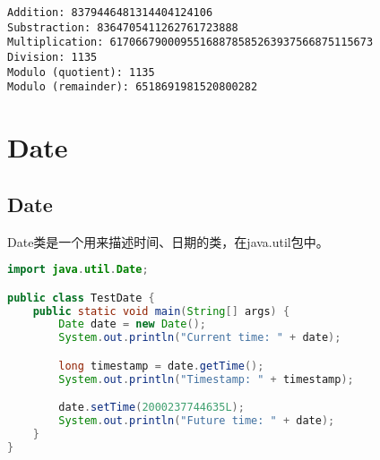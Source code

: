 \begin{tcolorbox}
	\begin{verbatim}
Addition: 8379446481314404124106
Substraction: 8364705411262761723888
Multiplication: 61706679000955168878585263937566875115673
Division: 1135
Modulo (quotient): 1135
Modulo (remainder): 6518691981520800282
	\end{verbatim}
\end{tcolorbox}

\newpage

\section{Date}

\subsection{Date}

Date类是一个用来描述时间、日期的类，在java.util包中。

\begin{table}[H]
	\centering
	\caption{Date类常用方法}
\end{table}


\begin{lstlisting}[language=Java]
import java.util.Date;

public class TestDate {
    public static void main(String[] args) {
        Date date = new Date();
        System.out.println("Current time: " + date);

        long timestamp = date.getTime();
        System.out.println("Timestamp: " + timestamp);

        date.setTime(2000237744635L);
        System.out.println("Future time: " + date);
    }
}
\end{lstlisting}

